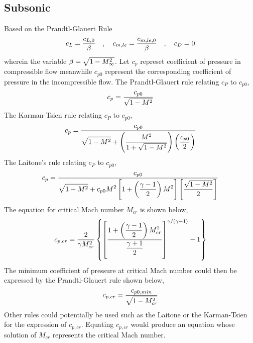 \documentclass[a4paper, 12pt]{report}
\begin{document}
\begin{center}
\subsection{Subsonic}
\begin{comment}
\end{comment}
Based on the Prandtl-Glauert Rule
$$c_L = \frac{c_{L,0}}{\beta} \quad,\quad c_{m,le}= \frac{c_{m,le,0}}{\beta} \quad,\quad c_D = 0$$
wherein the variable $\beta = \sqrt{1-M_\infty^2}$. Let $c_p$ represet coefficient of pressure in compressible flow meanwhile $c_{p0}$ represent the corresponding coefficient of pressure in the incompressible flow. The Prandtl-Glauert rule relating $c_P$ to $c_{p0}$,
$$c_p = \frac{c_{p0}}{\sqrt{1-M^2}}$$
The Karman-Tsien rule relating $c_P$ to $c_{p0}$,
$$c_p = \frac{c_{p0}}{\displaystyle{\sqrt{1-M^2} + \left(\frac{M^2}{1+\sqrt{1-M^2}}\right)\left(\frac{c_{p0}}{2}\right)}}$$
The Laitone's rule relating $c_P$ to $c_{p0}$,
$$c_p = \frac{c_{p0}}{\displaystyle{\sqrt{1-M^2} + c_{p0} M^2\left[1+\left(\frac{\gamma-1}{2}\right)M^2\right]\left[\frac{\sqrt{1-M^2}}{2}\right]}}$$
The equation for critical Mach number $M_{cr}$ is shown below,
$$c_{p,cr} = \frac{2}{\gamma M_{cr}^2}\left\{\left[\frac{\displaystyle{1+\left(\frac{\gamma-1}{2}\right)M_{cr}^2}}{\displaystyle{\frac{\gamma+1}{2}}}\right]^{\gamma/(\gamma-1)} - 1\right\}$$
The minimum coefficient of pressure at critical Mach number could then be expressed by the Prandtl-Glauert rule shown below,
$$c_{p,cr} = \frac{c_{p0,min}}{\sqrt{1-M_{cr}^2}}$$
Other rules could potentially be used such as the Laitone or the Karman-Tsien for the expression of $c_{p,cr}$. Equating $c_{p,cr}$ would produce an equation whose solution of $M_{cr}$ represents the critical Mach number.
\end{center}
\end{document}
